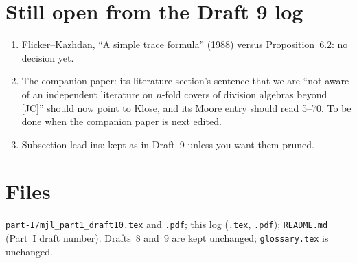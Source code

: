 \documentclass[11pt]{article}
\begin{document}
\section*{Still open from the Draft 9 log}
\begin{enumerate}[leftmargin=*]
\item Flicker--Kazhdan, ``A simple trace formula'' (1988) versus
Proposition~6.2: no decision yet.
\item The companion paper: its literature section's sentence that we
are ``not aware of an independent literature on $n$-fold covers of
division algebras beyond [JC]'' should now point to Klose, and its
Moore entry should read 5--70.  To be done when the companion paper is
next edited.
\item Subsection lead-ins: kept as in Draft~9 unless you want them
pruned.
\end{enumerate}

\section*{Files}
\texttt{part-I/mjl\_part1\_draft10.tex} and \texttt{.pdf}; this log
(\texttt{.tex}, \texttt{.pdf}); \texttt{README.md} (Part~I draft
number).  Drafts~8 and~9 are kept unchanged; \texttt{glossary.tex} is
unchanged.
\end{document}
